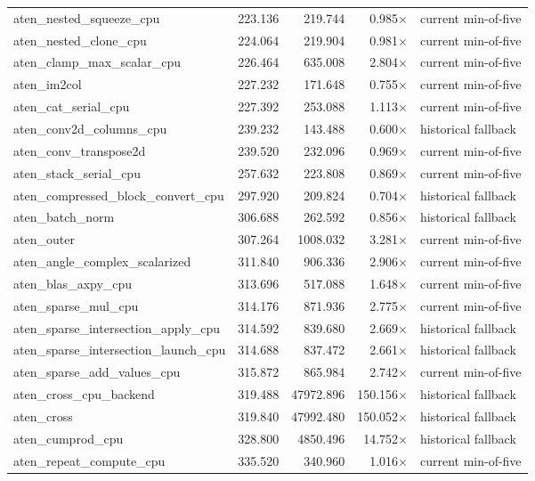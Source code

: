\begin{longtable}{lrrrl}
  aten\_nested\_squeeze\_cpu & 223.136 & 219.744 & 0.985$\times$ & current min-of-five \\
  aten\_nested\_clone\_cpu & 224.064 & 219.904 & 0.981$\times$ & current min-of-five \\
  aten\_clamp\_max\_scalar\_cpu & 226.464 & 635.008 & 2.804$\times$ & current min-of-five \\
  aten\_im2col & 227.232 & 171.648 & 0.755$\times$ & current min-of-five \\
  aten\_cat\_serial\_cpu & 227.392 & 253.088 & 1.113$\times$ & current min-of-five \\
  aten\_conv2d\_columns\_cpu & 239.232 & 143.488 & 0.600$\times$ & historical fallback \\
  aten\_conv\_transpose2d & 239.520 & 232.096 & 0.969$\times$ & current min-of-five \\
  aten\_stack\_serial\_cpu & 257.632 & 223.808 & 0.869$\times$ & current min-of-five \\
  aten\_compressed\_block\_convert\_cpu & 297.920 & 209.824 & 0.704$\times$ & historical fallback \\
  aten\_batch\_norm & 306.688 & 262.592 & 0.856$\times$ & historical fallback \\
  aten\_outer & 307.264 & 1008.032 & 3.281$\times$ & current min-of-five \\
  aten\_angle\_complex\_scalarized & 311.840 & 906.336 & 2.906$\times$ & current min-of-five \\
  aten\_blas\_axpy\_cpu & 313.696 & 517.088 & 1.648$\times$ & current min-of-five \\
  aten\_sparse\_mul\_cpu & 314.176 & 871.936 & 2.775$\times$ & current min-of-five \\
  aten\_sparse\_intersection\_apply\_cpu & 314.592 & 839.680 & 2.669$\times$ & historical fallback \\
  aten\_sparse\_intersection\_launch\_cpu & 314.688 & 837.472 & 2.661$\times$ & historical fallback \\
  aten\_sparse\_add\_values\_cpu & 315.872 & 865.984 & 2.742$\times$ & current min-of-five \\
  aten\_cross\_cpu\_backend & 319.488 & 47972.896 & 150.156$\times$ & historical fallback \\
  aten\_cross & 319.840 & 47992.480 & 150.052$\times$ & historical fallback \\
  aten\_cumprod\_cpu & 328.800 & 4850.496 & 14.752$\times$ & historical fallback \\
  aten\_repeat\_compute\_cpu & 335.520 & 340.960 & 1.016$\times$ & current min-of-five \\

\end{longtable}
